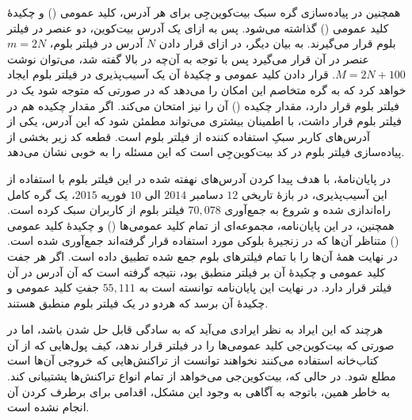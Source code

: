 همچنین در پیاده‌سازی گره سبک بیت‌کوین‌جِی برای هر آدرس، کلید عمومی () و چکیدهٔ کلید عمومی () گذاشته می‌شود. پس به ازای یک آدرس بیت‌کوین، دو عنصر در فیلتر بلوم قرار می‌گیرند. به بیان دیگر، در ازای قرار دادن $N$ آدرس در فیلتر بلوم، $m=2N$ عنصر در آن قرار می‌گیرد پس با توجه به آن‌چه در بالا گفته شد، می‌توان نوشت $M=2N+100$. قرار دادن کلید عمومی و چکیدهٔ آن یک آسیب‌پذیری در فیلتر بلوم ایجاد خواهد کرد که به گره متخاصم این امکان را می‌دهد که در صورتی که متوجه شود یک  در فیلتر بلوم قرار دارد، مقدار چکیده () آن  را نیز امتحان می‌کند. اگر مقدار چکیده هم در فیلتر بلوم قرار داشت، با اطمینان بیشتری می‌تواند مطمئن شود که این آدرس، یکی از آدرس‌های کاربر سبکِ استفاده کننده از فیلتر بلوم است. قطعه کد زیر بخشی از پیاده‌سازی فیلتر بلوم در کد بیت‌کوین‌جِی است \cite{bitcoinj_BloomFilter} که این مسئله را به خوبی نشان می‌دهد.




در پایان‌نامهٔ\cite{Nick2015}، با هدف پیدا کردن آدرس‌های نهفته شده در این فیلتر بلوم با استفاده از این آسیب‌پذیری، در بازهٔ تاریخی $12$ دسامبر $2014$ الی $10$ فوریه $2015$، یک گره کامل راه‌اندازی شده و شروع به جمع‌آوری $70,078$ فیلتر بلوم از کاربران سبک کرده است. همچنین، در این پایان‌نامه، مجموعه‌ای از تمام کلید عمومی‌ها () و چکیدهٔ کلید عمومی () متناظر آن‌ها که در زنجیرهٔ بلوکی مورد استفاده قرار گرفته‌اند جمع‌آوری شده است. در نهایت همهٔ آن‌ها را با تمام فیلتر‌های بلوم جمع شده تطبیق داده است. اگر هر جفت کلید عمومی و چکیدهٔ آن بر فیلتر منطبق بود، نتیجه گرفته است که آن آدرس در آن فیلتر قرار دارد. در نهایت این پایان‌نامه توانسته است به $55,111$ جفتِ کلید عمومی و چکیدهٔ آن برسد که هردو در یک فیلتر بلوم منطبق هستند.

هرچند که این ایراد به نظر ایرادی می‌آید که به سادگی قابل حل شدن باشد، اما در صورتی که بیت‌کوین‌جی کلید عمومی‌ها را در فیلتر قرار ندهد، کیف پول‌هایی که از آن کتاب‌خانه استفاده می‌کنند نخواهند توانست از تراکنش‌هایی که خروجی آن‌ها  است مطلع شود. در حالی که، بیت‌کوین‌جی می‌خواهد از تمام انواع تراکنش‌ها پشتیبانی کند. به خاطر همین، باتوجه به آگاهی به وجود این مشکل، اقدامی برای برطرف کردن آن انجام نشده است.

